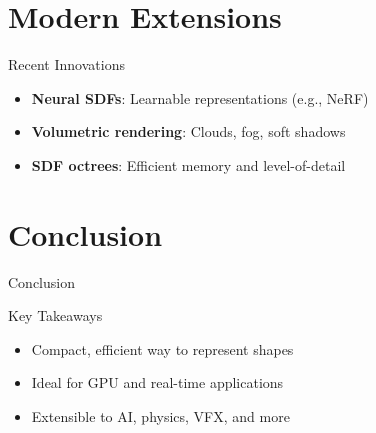 \section{Modern Extensions}
\begin{frame}{Recent Innovations}
  \begin{itemize}
    \item \textbf{Neural SDFs}: Learnable representations (e.g., NeRF)
    \item \textbf{Volumetric rendering}: Clouds, fog, soft shadows
    \item \textbf{SDF octrees}: Efficient memory and level-of-detail
  \end{itemize}
\end{frame}

\section{Conclusion}
\begin{frame}{Conclusion}
  \begin{conceptbox}{Key Takeaways}
    \begin{itemize}
      \item Compact, efficient way to represent shapes
      \item Ideal for GPU and real-time applications
      \item Extensible to AI, physics, VFX, and more
    \end{itemize}
  \end{conceptbox}
\end{frame}


